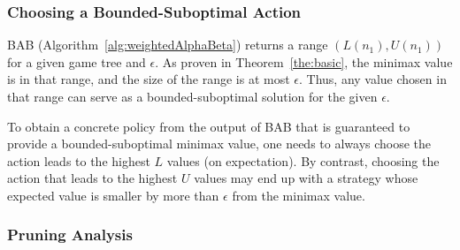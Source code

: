 \documentclass[runningheads]{llncs}
\newcommand{\MM}{\mathit{V}}
\newcommand{\pess}{\mathit{L}}
\newcommand{\opti}{\mathit{U}}
\newcommand{\besto}{\mathit{best}_{\opti}}
\newcommand{\bestp}{\mathit{best}_{\pess}}
\newcommand{\rootnode}{\mathit{n_1}}
\begin{document}



\subsubsection{Choosing a Bounded-Suboptimal Action}
BAB (Algorithm~\ref{alg:weightedAlphaBeta}) returns a range $(\pess(\rootnode), \opti(\rootnode))$ for a given game tree and $\epsilon$. As proven in Theorem~\ref{the:basic}, the minimax value is in that range, and the size of the range is at most $\epsilon$. Thus, any value chosen in that range can serve as a bounded-suboptimal solution for the given $\epsilon$. 

To obtain a concrete policy from the output of BAB that is guaranteed to provide a bounded-suboptimal minimax value, one needs to always choose the action leads to the highest $\pess$ values (on expectation). By contrast, choosing the action that leads to the highest $\opti$ values may end up with a strategy whose expected value is smaller by more than $\epsilon$ from the minimax value. 





\subsubsection{Pruning Analysis}
\end{document}
